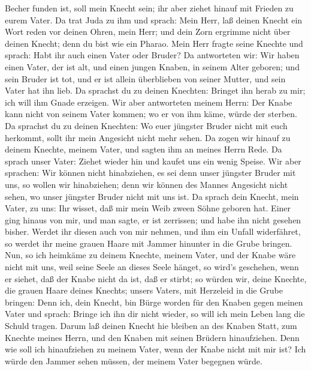 Becher funden ist, soll mein Knecht sein; ihr aber ziehet hinauf mit
Frieden zu eurem Vater.  Da trat Juda zu ihm und sprach:
Mein Herr, laß deinen Knecht ein Wort reden vor deinen Ohren, mein Herr;
und dein Zorn ergrimme nicht über deinen Knecht; denn du bist wie ein
Pharao.  Mein Herr fragte seine Knechte und sprach: Habt
ihr auch einen Vater oder Bruder?  Da antworteten wir: Wir
haben einen Vater, der ist alt, und einen jungen Knaben, in seinem Alter
geboren; und sein Bruder ist tot, und er ist allein überblieben von
seiner Mutter, und sein Vater hat ihn lieb.  Da sprachst du
zu deinen Knechten: Bringet ihn herab zu mir; ich will ihm Gnade
erzeigen.  Wir aber antworteten meinem Herrn: Der Knabe
kann nicht von seinem Vater kommen; wo er von ihm käme, würde der
sterben.  Da sprachst du zu deinen Knechten: Wo euer
jüngster Bruder nicht mit euch herkommt, sollt ihr mein Angesicht nicht
mehr sehen.  Da zogen wir hinauf zu deinem Knechte, meinem
Vater, und sagten ihm an meines Herrn Rede.  Da sprach
unser Vater: Ziehet wieder hin und kaufet uns ein wenig Speise.
 Wir aber sprachen: Wir können nicht hinabziehen, es sei
denn unser jüngster Bruder mit uns, so wollen wir hinabziehen; denn wir
können des Mannes Angesicht nicht sehen, wo unser jüngster Bruder nicht
mit uns ist.  Da sprach dein Knecht, mein Vater, zu uns:
Ihr wisset, daß mir mein Weib zween Söhne geboren hat. 
Einer ging hinaus von mir, und man sagte, er ist zerrissen; und habe ihn
nicht gesehen bisher.  Werdet ihr diesen auch von mir
nehmen, und ihm ein Unfall widerfähret, so werdet ihr meine grauen Haare
mit Jammer hinunter in die Grube bringen.  Nun, so ich
heimkäme zu deinem Knechte, meinem Vater, und der Knabe wäre nicht mit
uns, weil seine Seele an dieses Seele hänget,  so wird's
geschehen, wenn er siehet, daß der Knabe nicht da ist, daß er stirbt; so
würden wir, deine Knechte, die grauen Haare deines Knechts; unsers
Vaters, mit Herzeleid in die Grube bringen:  Denn ich, dein
Knecht, bin Bürge worden für den Knaben gegen meinen Vater und sprach:
Bringe ich ihn dir nicht wieder, so will ich mein Leben lang die Schuld
tragen.  Darum laß deinen Knecht hie bleiben an des Knaben
Statt, zum Knechte meines Herrn, und den Knaben mit seinen Brüdern
hinaufziehen.  Denn wie soll ich hinaufziehen zu meinem
Vater, wenn der Knabe nicht mit mir ist? Ich würde den Jammer sehen
müssen, der meinem Vater begegnen würde.

